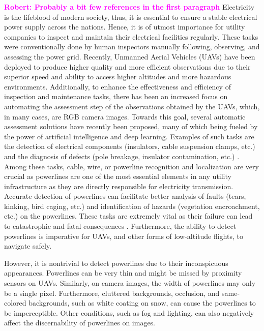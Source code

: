 \documentclass[journal]{IEEEtran}
\newcommand{\commentR}[1]{\textbf{\textcolor{magenta}{Robert: #1}}}
\begin{document}
\commentR{Probably a bit few references in the first paragraph} Electricity is the lifeblood of modern society, thus, it is essential to ensure a stable electrical power supply across the nations. Hence, it is of utmost importance for utility companies to inspect and maintain their electrical facilities regularly. These tasks were conventionally done by human inspectors manually following, observing, and assessing the power grid. Recently, Unmanned Aerial Vehicles (UAVs) have been deployed to produce higher quality and more efficient observations due to their superior speed and ability to access higher altitudes and more hazardous environments. Additionally, to enhance the effectiveness and efficiency of inspection and maintenance tasks, there has been an increased focus on automating the assessment step of the observations obtained by the UAVs, which, in many cases, are RGB camera images. Towards this goal, several automatic assessment solutions have recently been proposed, many of which being fueled by the power of artificial intelligence and deep learning. Examples of such tasks are the detection of electrical components (insulators, cable suspension clamps, etc.) and the diagnosis of defects (pole breakage, insulator contamination, etc.) \cite{nhan_examples, insulator_examples,detect_component_examples}. Among these tasks, cable, wire, or powerline recognition and localization are very crucial as powerlines are one of the most essential elements in any utility infrastructure as they are directly responsible for electricity transmission. Accurate detection of powerlines can facilitate better analysis of faults (tears, kinking, bird caging, etc.) and identification of hazards (vegetation encroachment, etc.) on the powerlines. These tasks are extremely vital as their failure can lead to catastrophic and fatal consequences \cite{pge_bankruptcy}. Furthermore, the ability to detect powerlines is imperative for UAVs, and other forms of low-altitude flights, to navigate safely.

However, it is nontrivial to detect powerlines due to their inconspicuous appearances. Powerlines can be very thin and might be missed by proximity sensors on UAVs. Similarly, on camera images, the width of powerlines may only be a single pixel. Furthermore, cluttered backgrounds, occlusion, and same-colored backgrounds, such as white coating on snow, can cause the powerlines to be imperceptible. Other conditions, such as fog and lighting, can also negatively affect the discernability of powerlines on images. 
\end{document}
